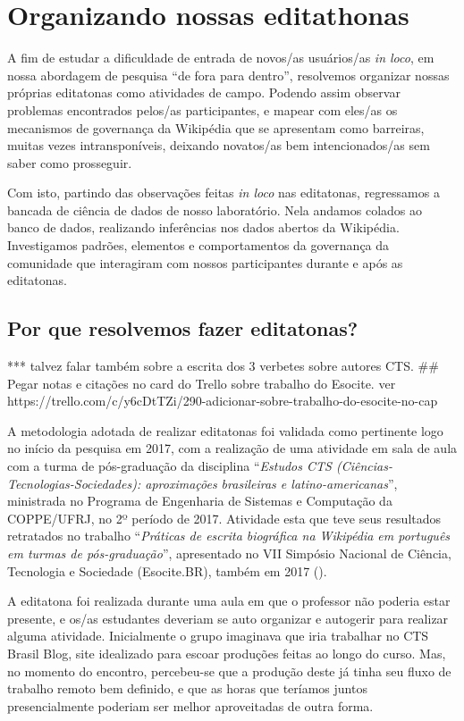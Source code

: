 \section{Organizando nossas editathonas}

A fim de estudar a dificuldade de entrada de novos/as usuários/as \textit{in loco}, em nossa abordagem de pesquisa ``de fora para dentro'', resolvemos organizar nossas próprias editatonas como atividades de campo. Podendo assim observar problemas encontrados pelos/as participantes, e mapear com eles/as os mecanismos de governança da Wikipédia que se apresentam como barreiras, muitas vezes intransponíveis, deixando novatos/as bem intencionados/as sem saber como prosseguir.

Com isto, partindo das observações feitas \textit{in loco} nas editatonas, regressamos a bancada de ciência de dados de nosso laboratório. Nela andamos colados ao banco de dados, realizando inferências nos dados abertos da Wikipédia. Investigamos padrões, elementos e comportamentos da governança da comunidade que interagiram com nossos participantes durante e após as editatonas.

\subsection{Por que resolvemos fazer editatonas?}

*** talvez falar também sobre a escrita dos 3 verbetes sobre autores CTS. ## Pegar notas e citações no card do Trello sobre trabalho do Esocite. ver https://trello.com/c/y6cDtTZi/290-adicionar-sobre-trabalho-do-esocite-no-cap%

A metodologia adotada de realizar editatonas foi validada como pertinente logo no início da pesquisa em 2017, com a realização de uma atividade em sala de aula com a turma de pós-graduação da disciplina ``\textit{Estudos CTS (Ciências-Tecnologias-Sociedades): aproximações brasileiras e latino-americanas}'', ministrada no Programa de Engenharia de Sistemas e Computação da COPPE/UFRJ, no 2º período de 2017. Atividade esta que teve seus resultados retratados no trabalho ``\textit{Práticas de escrita biográfica na Wikipédia em português em turmas de pós-graduação}'', apresentado no VII Simpósio Nacional de Ciência, Tecnologia e Sociedade (Esocite.BR), também em 2017 (\cite{andrade_historias_2017}).

A editatona foi realizada durante uma aula em que o professor não poderia estar presente, e os/as estudantes deveriam se auto organizar e autogerir para realizar alguma atividade. Inicialmente o grupo imaginava que iria trabalhar no CTS Brasil Blog, site idealizado para escoar produções feitas ao longo do curso. Mas, no momento do encontro, percebeu-se que a produção deste já tinha seu fluxo de trabalho remoto bem definido, e que as horas que teríamos juntos presencialmente poderiam ser melhor aproveitadas de outra forma.

